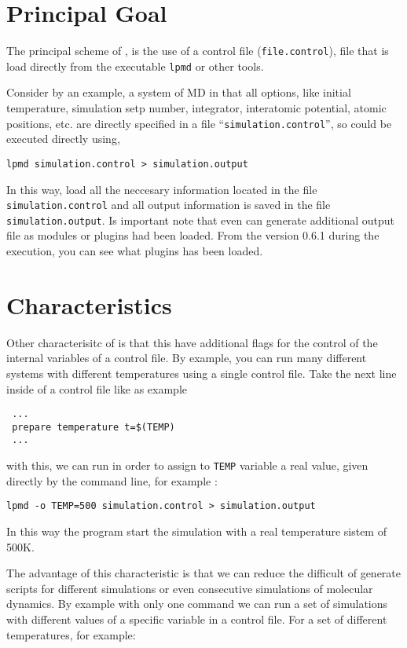 \section{Principal Goal}

The principal scheme of {\lpmd}, is the use of a control file
(\verb|file.control|), file that is load directly from the executable
\verb|lpmd| or other tools.

Consider by an example, a system of MD in that all options, like initial
temperature, simulation setp number, integrator, interatomic potential, atomic
positions, etc. are directly specified in a file ``\verb|simulation.control|'',
so {\lpmd} could be executed directly using, 

\begin{center}
 \texttt{lpmd simulation.control > simulation.output}
\end{center}
\noindent

In this way, {\lpmd} load all the neccesary information located in the file
\verb|simulation.control| and all output information is saved in the file
\verb|simulation.output|. Is important note that {\lpmd} even can generate
additional output file as modules or plugins had been loaded. From the version
0.6.1 during the {\lpmd} execution, you can see what plugins has been loaded.

\section{Characteristics}

Other characterisitc of {\lpmd} is that this have additional flags for the
control of the internal variables of a control file. By example, you can run
many different systems with different temperatures using a single control file.
Take the next line inside of a control file like as example

\begin{verbatim}
 ...
 prepare temperature t=$(TEMP)
 ...
\end{verbatim}
\noindent
with this, we can run {\lpmd} in order to assign to \verb|TEMP| variable a real
value, given directly by the command line, for example :

\begin{center}
 \texttt{lpmd -o TEMP=500 simulation.control > simulation.output}
\end{center}
\noindent
In this way the program start the simulation with a real temperature sistem of
500K.

The advantage of this characteristic is that we can reduce the difficult of
generate scripts for different simulations or even consecutive simulations of
molecular dynamics. By example with only one command we can run a set of
simulations with different values of a specific variable in a control file. For
a set of different temperatures, for example:

